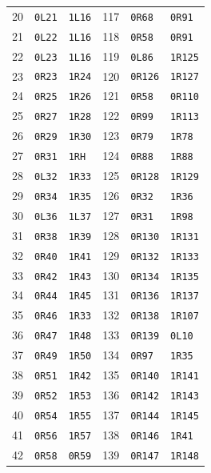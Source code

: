 {\begin{longtable}{@{}rll@{\qquad\quad}rll@{}}
20 & \texttt{0L21} & \texttt{1L16} & 117 & \texttt{0R68} & \texttt{0R91}\\
21 & \texttt{0L22} & \texttt{1L16} & 118 & \texttt{0R58} & \texttt{0R91}\\
22 & \texttt{0L23} & \texttt{1L16} & 119 & \texttt{0L86} & \texttt{1R125}\\
23 & \texttt{0R23} & \texttt{1R24} & 120 & \texttt{0R126} & \texttt{1R127}\\
24 & \texttt{0R25} & \texttt{1R26} & 121 & \texttt{0R58} & \texttt{0R110}\\
25 & \texttt{0R27} & \texttt{1R28} & 122 & \texttt{0R99} & \texttt{1R113}\\
26 & \texttt{0R29} & \texttt{1R30} & 123 & \texttt{0R79} & \texttt{1R78}\\
27 & \texttt{0R31} & \texttt{1RH} & 124 & \texttt{0R88} & \texttt{1R88}\\
28 & \texttt{0L32} & \texttt{1R33} & 125 & \texttt{0R128} & \texttt{1R129}\\
29 & \texttt{0R34} & \texttt{1R35} & 126 & \texttt{0R32} & \texttt{1R36}\\
30 & \texttt{0L36} & \texttt{1L37} & 127 & \texttt{0R31} & \texttt{1R98}\\
31 & \texttt{0R38} & \texttt{1R39} & 128 & \texttt{0R130} & \texttt{1R131}\\
32 & \texttt{0R40} & \texttt{1R41} & 129 & \texttt{0R132} & \texttt{1R133}\\
33 & \texttt{0R42} & \texttt{1R43} & 130 & \texttt{0R134} & \texttt{1R135}\\
34 & \texttt{0R44} & \texttt{1R45} & 131 & \texttt{0R136} & \texttt{1R137}\\
35 & \texttt{0R46} & \texttt{1R33} & 132 & \texttt{0R138} & \texttt{1R107}\\
36 & \texttt{0R47} & \texttt{1R48} & 133 & \texttt{0R139} & \texttt{0L10}\\
37 & \texttt{0R49} & \texttt{1R50} & 134 & \texttt{0R97} & \texttt{1R35}\\
38 & \texttt{0R51} & \texttt{1R42} & 135 & \texttt{0R140} & \texttt{1R141}\\
39 & \texttt{0R52} & \texttt{1R53} & 136 & \texttt{0R142} & \texttt{1R143}\\
40 & \texttt{0R54} & \texttt{1R55} & 137 & \texttt{0R144} & \texttt{1R145}\\
41 & \texttt{0R56} & \texttt{1R57} & 138 & \texttt{0R146} & \texttt{1R41}\\
42 & \texttt{0R58} & \texttt{0R59} & 139 & \texttt{0R147} & \texttt{1R148}\\

\end{longtable}}
